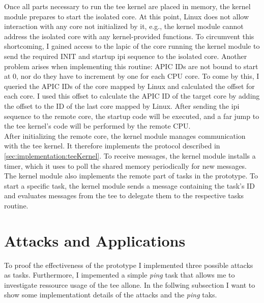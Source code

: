 Once all parts necessary to run the \gls{tee} kernel are placed in memory, the
kernel module prepares to start the isolated core. At this point, Linux does not
allow interaction with any core not initialized by it, e.g., the kernel module
cannot address the isolated core with any kernel-provided functions. To
circumvent this shortcoming, I gained access to the \gls{lapic} of the core
running the kernel module to send the required INIT and startup \gls{ipi}
sequence to the isolated core. Another problem arises when implementing this
routine: APIC IDs are not bound to start at 0, nor do they have to increment by
one for each CPU core. To come by this, I queried the APIC IDs of the core
mapped by Linux and calculated the offset for each core. I used this offset to
calculate the APIC ID of the target core by adding the offset to the ID of the
last core mapped by Linux. After sending the \gls{ipi} sequence to the remote
core, the startup code will be executed, and a far jump to the \gls{tee}
kernel's code will be performed by the remote CPU.\\

After initializing the remote core, the kernel module manages communication with
the \gls{tee} kernel. It therefore implements the protocol described in
\ref{sec:implementation:teeKernel}. To receive messages, the kernel module
installs a timer, which it uses to poll the shared memory periodically for new
messages. The kernel module also implements the remote part of tasks in the
prototype. To start a specific task, the kernel module sends a message
containing the task's ID and evaluates messages from the \gls{tee} to delegate
them to the respective tasks routine. \\

\section{Attacks and Applications}
\label{sec:implementation:attacks}

To proof the effectiveness of the prototype I implemented three possible attacks
as tasks. Furthermore, I impemented a simple \textit{ping} task that allows me
to investigate ressource usage of the \gls{tee} allone. In the follwing
subsection I want to show some implementationt details of the attacks and the
\textit{ping} taks.

